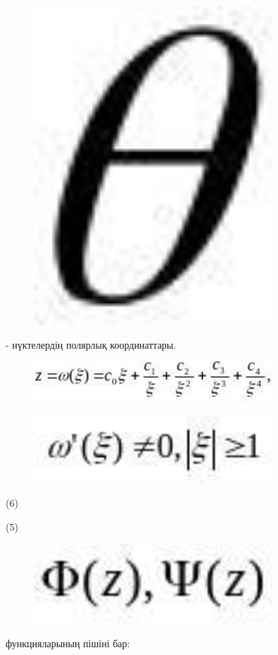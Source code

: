 \begin{figure}[H]
	\centering
	\includegraphics[width=0.8\textwidth]{assets/1278}
	\caption*{}
\end{figure} - нүктелердің полярлық
координаттары.

\begin{figure}[H]
	\centering
	\includegraphics[width=0.8\textwidth]{assets/1279}
	\caption*{}
\end{figure}\begin{figure}[H]
	\centering
	\includegraphics[width=0.8\textwidth]{assets/1280}
	\caption*{}
\end{figure}
(6)

(5) \begin{figure}[H]
	\centering
	\includegraphics[width=0.8\textwidth]{assets/1281}
	\caption*{}
\end{figure} функцияларының пішіні бар:

